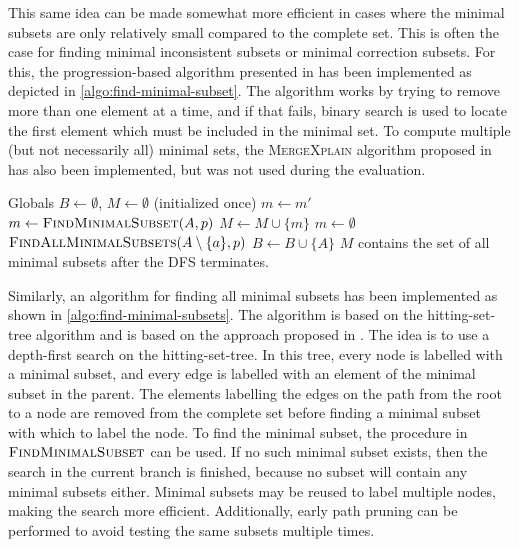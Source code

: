 This same idea can be made somewhat more efficient in cases where the minimal subsets are only relatively small compared to the complete set. This is often the case for finding minimal inconsistent subsets or minimal correction subsets. For this, the progression-based algorithm presented in \cite{marques2013minimal} has been implemented as depicted in \cref{algo:find-minimal-subset}. The algorithm works by trying to remove more than one element at a time, and if that fails, binary search is used to locate the first element which must be included in the minimal set.
To compute multiple (but not necessarily all) minimal sets, the \textsc{MergeXplain} algorithm proposed in \cite{shchekotykhin2015mergexplain} has also been implemented, but was not used during the evaluation.

\begin{algorithm}[ht]
  \begin{algorithmic}
    \State Globals \enspace $B \gets \emptyset$, \enspace $M \gets \emptyset$ \quad (initialized once)
        \State $m \gets m'$
        \State $m \gets \textsc{FindMinimalSubset}(A, p)$
        \State $M \gets M \cup \{ m \}$
      \Else
        \State $m \gets \emptyset$
      \EndIf
        \State $\textsc{FindAllMinimalSubsets}(A \setminus \{ a \}, p)$
      \EndFor
      \State $B \gets B \cup \{ A \}$
    \EndIf
    \State $M$ contains the set of all minimal subsets after the DFS terminates.
  \end{algorithmic}
  \caption{$\textsc{FindAllMinimalSubsets}(A, p)$}
  \label{algo:find-minimal-subsets}
\end{algorithm}

Similarly, an algorithm for finding all minimal subsets has been implemented as shown in \cref{algo:find-minimal-subsets}. The algorithm is based on the hitting-set-tree algorithm \cite{reiter1987theory} and is based on the approach proposed in \cite{kalyanpur2007finding}. The idea is to use a depth-first search on the hitting-set-tree. In this tree, every node is labelled with a minimal subset, and every edge is labelled with an element of the minimal subset in the parent. The elements labelling the edges on the path from the root to a node are removed from the complete set before finding a minimal subset with which to label the node. To find the minimal subset, the procedure in $\textsc{FindMinimalSubset}$ can be used. If no such minimal subset exists, then the search in the current branch is finished, because no subset will contain any minimal subsets either. Minimal subsets may be reused to label multiple nodes, making the search more efficient. Additionally, early path pruning can be performed to avoid testing the same subsets multiple times.

